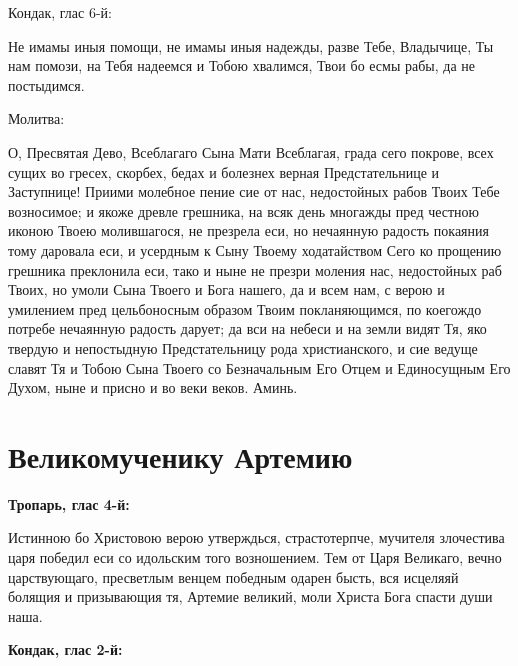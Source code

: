 \bfseries 

Кондак, глас 6-й:\normalfont{}


Не имамы иныя помощи, не имамы иныя надежды, разве Тебе, Владычице, Ты нам помози, на Тебя надеемся и Тобою хвалимся, Твои бо есмы рабы, да не постыдимся. 

\bfseries 

Молитва:\normalfont{}


О, Пресвятая Дево, Всеблагаго Сына Мати Всеблагая, града сего покрове, всех сущих во гресех, скорбех, бедах и болезнех верная Предстательнице и Заступнице! Приими молебное пение сие от нас, недостойных рабов Твоих Тебе возносимое; и якоже древле грешника, на всяк день многажды пред честною иконою Твоею молившагося, не презрела еси, но нечаянную радость покаяния тому даровала еси, и усердным к Сыну Твоему ходатайством Сего ко прощению грешника преклонила еси, тако и ныне не презри моления нас, недостойных раб Твоих, но умоли Сына Твоего и Бога нашего, да и всем нам, с верою и умилением пред цельбоносным образом Твоим покланяющимся, по коегождо потребе нечаянную радость дарует; да вси на небеси и на земли видят Тя, яко твердую и непостыдную Предстательницу рода христианского, и сие ведуще славят Тя и Тобою Сына Твоего со Безначальным Его Отцем и Единосущным Его Духом, ныне и присно и во веки веков. Аминь.



\nopagebreak\bigskip\bigskip\mychapterending


 

\section{Великомученику Артемию}
 


\bfseries Тропарь, глас 4-й:\normalfont{}\nopagebreak


Истинною бо Христовою верою утверждься, страстотерпче, мучителя злочестива царя победил еси со идольским того возношением. Тем от Царя Великаго, вечно царствующаго, пресветлым венцем победным одарен бысть, вся исцеляяй болящия и призывающия тя, Артемие великий, моли Христа Бога спасти души наша.


\medskip


\bfseries Кондак, глас 2-й:\normalfont{}\nopagebreak


